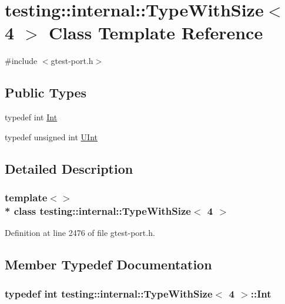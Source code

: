 \hypertarget{classtesting_1_1internal_1_1_type_with_size_3_014_01_4}{}\section{testing\+:\+:internal\+:\+:Type\+With\+Size$<$ 4 $>$ Class Template Reference}
\label{classtesting_1_1internal_1_1_type_with_size_3_014_01_4}


{\ttfamily \#include $<$gtest-\/port.\+h$>$}

\subsection*{Public Types}
\begin{DoxyCompactItemize}
\item 
typedef int \hyperlink{classtesting_1_1internal_1_1_type_with_size_3_014_01_4_a80351860c00ed665e73f952143f4484a}{Int}
\item 
typedef unsigned int \hyperlink{classtesting_1_1internal_1_1_type_with_size_3_014_01_4_a7d559570f830bf35d095eeb94d98de58}{U\+Int}
\end{DoxyCompactItemize}


\subsection{Detailed Description}
\subsubsection*{template$<$$>$\\*
class testing\+::internal\+::\+Type\+With\+Size$<$ 4 $>$}



Definition at line 2476 of file gtest-\/port.\+h.



\subsection{Member Typedef Documentation}
\subsubsection[{\texorpdfstring{Int}{Int}}]{\setlength{\rightskip}{0pt plus 5cm}typedef int {\bf testing\+::internal\+::\+Type\+With\+Size}$<$ 4 $>$\+::{\bf Int}}\hypertarget{classtesting_1_1internal_1_1_type_with_size_3_014_01_4_a80351860c00ed665e73f952143f4484a}{}\label{classtesting_1_1internal_1_1_type_with_size_3_014_01_4_a80351860c00ed665e73f952143f4484a}


